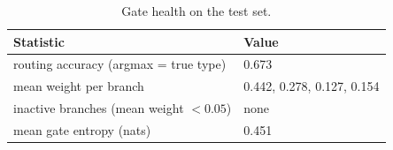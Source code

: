 \begin{table}[t]
\centering
\caption{Gate health on the test set.}
\label{tab:t3_health}
\footnotesize
\begin{tabular}{ll}
\toprule
Statistic & Value \\
\midrule
routing accuracy (argmax = true type) & 0.673 \\
mean weight per branch & 0.442, 0.278, 0.127, 0.154 \\
inactive branches (mean weight $<0.05$) & none \\
mean gate entropy (nats) & 0.451 \\
\bottomrule
\end{tabular}
\end{table}
